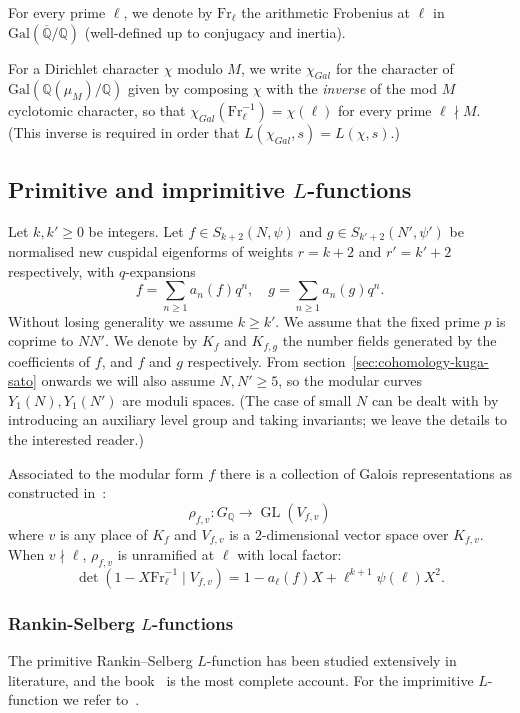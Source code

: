 \documentclass[11pt, a4paper, reqno]{amsart}
\theoremstyle{definition}
\theoremstyle{plain}
\theoremstyle{remark}
\DeclareMathOperator{\GL}{GL}
\newcommand{\numberset}{\mathbb}
\newcommand{\Q}{\numberset{Q}}
\newcommand{\Frob}{\mathrm{Fr}}
\newcommand{\gal}[2]{\mathrm{Gal}({#1}/{#2})}
\renewcommand{\ge}{\geqslant}
\renewcommand{\geq}{\ge}
\begin{document}
  For every prime $\ell$, we denote by $\Frob_\ell$ the arithmetic Frobenius at $\ell$ in $\gal{\overline{\Q}}{\Q}$ (well-defined up to conjugacy and inertia).

  For a Dirichlet character $\chi$ modulo $M$, we write $\chi_{Gal}$ for the character of $\gal{\Q(\mu_M)}{\Q}$ given by composing $\chi$ with the \emph{inverse} of the mod $M$ cyclotomic character, so that $\chi_{Gal}(\Frob_\ell^{-1}) = \chi(\ell)$ for every prime $\ell \nmid M$. (This inverse is required in order that $L(\chi_{Gal}, s) = L(\chi, s)$.)

 \subsection{Primitive and imprimitive \texorpdfstring{$L$}{L}-functions}
  \label{subsec:primitive-imprimitive-functions}

  Let $k, k' \geq 0$ be integers. Let $f \in S_{k+2}(N,\psi)$ and $g \in S_{k'+2}(N',\psi')$ be normalised new cuspidal eigenforms of weights $r=k+2$ and $r'=k'+2$ respectively, with $q$-expansions
  \[
   f = \sum_{n \geq 1} a_n(f)q^n, \quad g = \sum_{n \geq 1} a_n(g)q^n.
  \]
  Without losing generality we assume $k \geq k'$. We assume that the fixed prime $p$ is coprime to $NN'$. We denote by $K_f$ and $K_{f,g}$ the number fields generated by the coefficients of $f$, and $f$ and $g$ respectively. From section~\ref{sec:cohomology-kuga-sato} onwards we will also assume $N, N'\geq 5$, so the modular curves $Y_1(N), Y_1(N')$ are moduli spaces. (The case of small $N$ can be dealt with by introducing an auxiliary level group and taking invariants; we leave the details to the interested reader.)

  Associated to the modular form $f$ there is a collection of Galois representations as constructed in~\cite{deligne69}:
  \[
   \rho_{f,v} \colon G_{\Q} \to \GL(V_{f,v})
  \]
  where $v$ is any place of $K_f$ and $V_{f,v}$ is a $2$-dimensional vector space over $K_{f, v}$. When $v \nmid \ell$, $\rho_{f,v}$ is unramified at $\ell$ with local factor:
  \[
   \det(1 - X\Frob_\ell^{-1} \mid V_{f,v}) = 1 - a_\ell(f)X + \ell^{k+1}\psi(\ell)X^2.
  \]

  \subsubsection*{Rankin-Selberg $L$-functions} The primitive Rankin--Selberg $L$-function has been studied extensively in literature, and the book~\cite{jacquet72} is the most complete account. For the imprimitive $L$-function we refer to~\cite{shimura76,shimura77}.
  
\end{document}
